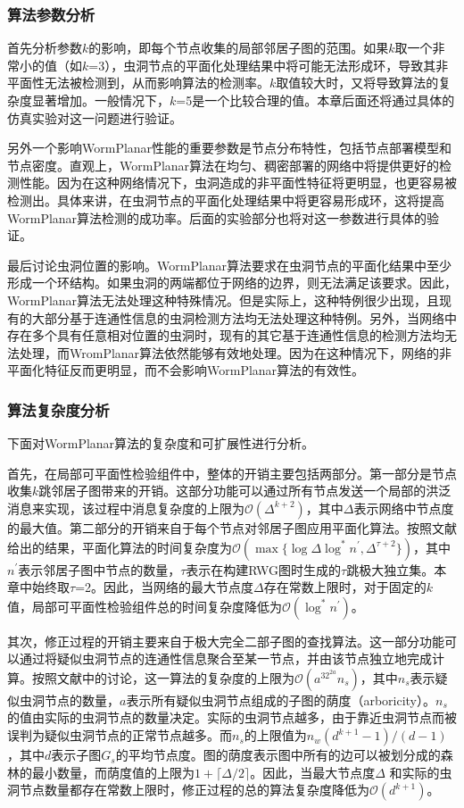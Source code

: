 \subsubsection{算法参数分析}
首先分析参数$k$的影响，即每个节点收集的局部邻居子图的范围。如果$k$取一个非常小的值（如$k$=3），虫洞节点的平面化处理结果中将可能无法形成环，导致其非平面性无法被检测到，从而影响算法的检测率。$k$取值较大时，又将导致算法的复杂度显著增加。一般情况下，$k$=5是一个比较合理的值。本章后面还将通过具体的仿真实验对这一问题进行验证。

另外一个影响WormPlanar性能的重要参数是节点分布特性，包括节点部署模型和节点密度。直观上，WormPlanar算法在均匀、稠密部署的网络中将提供更好的检测性能。因为在这种网络情况下，虫洞造成的非平面性特征将更明显，也更容易被检测出。具体来讲，在虫洞节点的平面化处理结果中将更容易形成环，这将提高WormPlanar算法检测的成功率。后面的实验部分也将对这一参数进行具体的验证。

最后讨论虫洞位置的影响。WormPlanar算法要求在虫洞节点的平面化结果中至少形成一个环结构。如果虫洞的两端都位于网络的边界，则无法满足该要求。因此，WormPlanar算法无法处理这种特殊情况。但是实际上，这种特例很少出现，且现有的大部分基于连通性信息的虫洞检测方法均无法处理这种特例。另外，当网络中存在多个具有任意相对位置的虫洞时，现有的其它基于连通性信息的检测方法均无法处理，而WromPlanar算法依然能够有效地处理。因为在这种情况下，网络的非平面化特征反而更明显，而不会影响WormPlanar算法的有效性。

\subsubsection{算法复杂度分析}
下面对WormPlanar算法的复杂度和可扩展性进行分析。

首先，在局部可平面性检验组件中，整体的开销主要包括两部分。第一部分是节点收集$k$跳邻居子图带来的开销。这部分功能可以通过所有节点发送一个局部的洪泛消息来实现，该过程中消息复杂度的上限为$\mathcal{O}(\Delta^{k+2})$，其中$\Delta$表示网络中节点度的最大值。第二部分的开销来自于每个节点对邻居子图应用平面化算法。按照文献给出的结果，平面化算法的时间复杂度为$\mathcal{O}(\max\{\log\Delta\log^*n^{'},\Delta^{\tau+2}\})$，其中$n^{'}$表示邻居子图中节点的数量，$\tau$表示在构建RWG图时生成的$\tau$跳极大独立集。本章中始终取$\tau$=2。因此，当网络的最大节点度$\Delta$存在常数上限时，对于固定的$k$值，局部可平面性检验组件总的时间复杂度降低为$\mathcal{O}(\log^*n^{'})$。

其次，修正过程的开销主要来自于极大完全二部子图的查找算法。这一部分功能可以通过将疑似虫洞节点的连通性信息聚合至某一节点，并由该节点独立地完成计算。按照文献中的讨论，这一算法的复杂度的上限为$\mathcal{O}(a^32^{2a}n_s)$，其中$n_s$表示疑似虫洞节点的数量，$a$表示所有疑似虫洞节点组成的子图的荫度（arboricity）。$n_s$的值由实际的虫洞节点的数量决定。实际的虫洞节点越多，由于靠近虫洞节点而被误判为疑似虫洞节点的正常节点越多。而$n_s$的上限值为$n_w(d^{k+1}-1)/(d-1)$，其中$d$表示子图$G_s$的平均节点度。图的荫度表示图中所有的边可以被划分成的森林的最小数量，而荫度值的上限为$1+\lceil\Delta/2\rceil$。因此，当最大节点度$\Delta$ 和实际的虫洞节点数量都存在常数上限时，修正过程的总的算法复杂度降低为$\mathcal{O}(d^{k+1})$。

